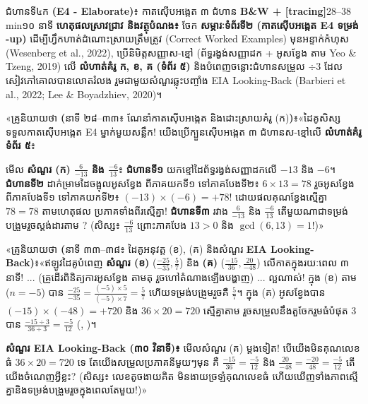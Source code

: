 \documentclass[a4paper,12pt]{article}
\newcommand{\en}[1]{{\TimesEn #1}}
\newcommand{\enbf}[1]{{\TimesEn\textbf{#1}}}
\newcommand{\cnum}[1]{{\TimesEn\fontsize{10.5pt}{12pt}\selectfont\ding{\numexpr181+#1\relax}}}
\newcommand{\teachersay}[1]{{\muol\fontsize{10.8pt}{15.5pt}\selectfont «គ្រូនិយាយថា \enbf{(}#1\enbf{)}៖}\hspace{0.25em}}
\begin{document}
\begin{phasebox}{ជំហានទី៤ក \enbf{(E4 - Elaborate)}៖ កាតស៊ើបអង្កេត ៣ ជំហាន \enbf{B\&W + [tracing]}}{28--38 min}{១០ នាទី}
\textbf{ហេតុផលស្រាវជ្រាវ និងវត្ថុបំណង៖} ចែក \textbf{សម្ភារៈទំព័រទី២ (កាតស៊ើបអង្កេត \en{E4} ទម្រង់ \en{2-up})} ដើម្បីហ្វឹកហាត់ដំណោះស្រាយត្រឹមត្រូវ (\en{Correct Worked Examples}) មុនអន្ទាក់កំហុស \en{(Wesenberg et al., 2022)}, ប្រើនិមិត្តសញ្ញាស-ខ្មៅ (ព័ទ្ធរង្វង់សញ្ញាដក + អូសខ្វែង \en{[tracing]} តាម \en{Yeo \& Tzeng, 2019}) លើ \textbf{លំហាត់គំរូ ក, ខ, គ (ទំព័រ ៥)} និងបំពេញចន្លោះជំហានសម្រួល $\div 3$ ដែលសៀវភៅគោលបានលោតរំលង រួមជាមួយសំណួរឆ្លុះបញ្ចាំង \en{EIA Looking-Back} \en{(Barbieri et al., 2022; Lee \& Boyadzhiev, 2020)}។
\end{phasebox}
\begin{scriptbox}
  \teachersay{នាទី ២៨--៣៣៖ ណែនាំកាតស៊ើបអង្កេត និងដោះស្រាយគំរូ (ក)}«ដៃគូសិស្សទទួលកាតស៊ើបអង្កេត \en{E4} ម្នាក់មួយសន្លឹក! យើងប្រើក្បួនស៊ើបអង្កេត ៣ ជំហានស-ខ្មៅលើ \textbf{លំហាត់គំរូ ទំព័រ ៥}៖\par
  មើល \textbf{សំណួរ (ក) $\frac{6}{-13}$ និង $\frac{-6}{13}$}៖ \textbf{ជំហានទី១} យកខ្មៅដៃព័ទ្ធរង្វង់សញ្ញាដកលើ $-13$ និង $-6$។ \textbf{ជំហានទី២} ដាក់ម្រាមដៃចង្អុលអូសខ្វែង \en{[tracing]} ពីភាគយកទី១ ទៅភាគបែងទី២៖ $6\times 13 = 78$ រួចអូសខ្វែងពីភាគបែងទី១ ទៅភាគយកទី២៖ $(-13)\times(-6) = +78$! ដោយផលគុណខ្វែងស្មើគ្នា $78=78$ តាមហេតុផល \cnum{1} ប្រភាគទាំងពីរស្មើគ្នា! \textbf{ជំហានទី៣} រវាង $\frac{6}{-13}$ និង $\frac{-6}{13}$ តើមួយណាជាទម្រង់បង្រួមរួចស្ដង់ដារតាម \cnum{5}? (សិស្ស៖ $\frac{-6}{13}$ ព្រោះភាគបែង $13>0$ និង $\gcd(6,13)=1$!)»\par\vspace{2.5pt}
  \teachersay{នាទី ៣៣--៣៨៖ ដៃគូអនុវត្ត (ខ), (គ) និងសំណួរ \enbf{EIA Looking-Back}}«ឥឡូវដៃគូបំពេញ \textbf{សំណួរ (ខ)} ($\frac{-25}{-35}, \frac{5}{7}$) និង \textbf{(គ)} ($\frac{-15}{36}, \frac{20}{-48}$) លើកាតក្នុងរយៈពេល ៣ នាទី! ... (គ្រូដើរពិនិត្យការអូសខ្វែង \en{[tracing]} តាមតុ រួចហៅតំណាងឡើងបង្ហាញ) ... ល្អណាស់! ក្នុង (ខ) តាម \cnum{2} ($n=-5$) បាន $\frac{-25}{-35}=\frac{(-5)\times 5}{(-5)\times 7}=\frac{5}{7}$ ហើយទម្រង់បង្រួមរួចគឺ $\frac{5}{7}$។ ក្នុង (គ) អូសខ្វែងបាន $(-15)\times(-48)=+720$ និង $36\times 20=720$ ស្មើគ្នាតាម \cnum{1} រួចសម្រួលនឹងតួចែករួមធំបំផុត $3$ បាន $\frac{-15\div 3}{36\div 3}=\frac{-5}{12}$ (\cnum{2}, \cnum{5})។\par
  \textbf{សំណួរ \en{EIA Looking-Back} (៣០ វិនាទី)៖} មើលសំណួរ (គ) ម្ដងទៀត! បើយើងមិនគុណលេខធំ $36\times 20=720$ ទេ តែយើងសម្រួលប្រភាគនីមួយៗមុន គឺ $\frac{-15}{36}=\frac{-5}{12}$ និង $\frac{20}{-48}=\frac{-20}{48}=\frac{-5}{12}$ តើយើងចំណេញអ្វីខ្លះ? (សិស្ស៖ លេខតូចងាយគិត មិនងាយច្រឡំគុណលេខធំ ហើយឃើញទាំងភាពស្មើគ្នានិងទម្រង់បង្រួមរួចក្នុងពេលតែមួយ!)»
\end{scriptbox}
\end{document}
